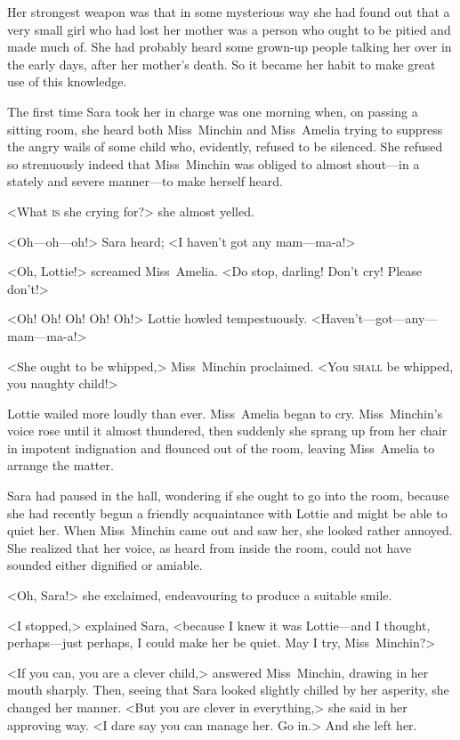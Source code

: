 Her strongest weapon was that in some mysterious way she had found out that a very small girl who had lost her mother was a person who ought to be pitied and made much of. She had probably heard some grown-up people talking her over in the early days, after her mother's death. So it became her habit to make great use of this knowledge.

The first time Sara took her in charge was one morning when, on passing a sitting room, she heard both Miss~Minchin and Miss~Amelia trying to suppress the angry wails of some child who, evidently, refused to be silenced. She refused so strenuously indeed that Miss~Minchin was obliged to almost shout—in a stately and severe manner—to make herself heard.

<What \textsc{is} she crying for?> she almost yelled.

<Oh—oh—oh!> Sara heard; <I haven't got any mam—ma-a!>

<Oh, Lottie!> screamed Miss~Amelia. <Do stop, darling! Don't cry! Please don't!>

<Oh! Oh! Oh! Oh! Oh!> Lottie howled tempestuously. <Haven't—got—any—mam—ma-a!>

<She ought to be whipped,> Miss~Minchin proclaimed. <You \textsc{shall} be whipped, you naughty child!>

Lottie wailed more loudly than ever. Miss~Amelia began to cry. Miss~Minchin's voice rose until it almost thundered, then suddenly she sprang up from her chair in impotent indignation and flounced out of the room, leaving Miss~Amelia to arrange the matter.

Sara had paused in the hall, wondering if she ought to go into the room, because she had recently begun a friendly acquaintance with Lottie and might be able to quiet her. When Miss~Minchin came out and saw her, she looked rather annoyed. She realized that her voice, as heard from inside the room, could not have sounded either dignified or amiable.

<Oh, Sara!> she exclaimed, endeavouring to produce a suitable smile.

<I stopped,> explained Sara, <because I knew it was Lottie—and I thought, perhaps—just perhaps, I could make her be quiet. May I try, Miss~Minchin?>

<If you can, you are a clever child,> answered Miss~Minchin, drawing in her mouth sharply. Then, seeing that Sara looked slightly chilled by her asperity, she changed her manner. <But you are clever in everything,> she said in her approving way. <I dare say you can manage her. Go in.> And she left her.

